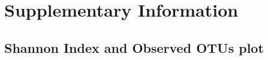 

\renewcommand{\thefigure}{SI.\arabic{figure}}
\setcounter{figure}{0}

\renewcommand{\thetable}{SI.\arabic{table}}
\setcounter{table}{0}

\section*{Supplementary Information}\label{sec:SI}

\renewcommand{\thesubsection}{SI.\arabic{subsection}}
\setcounter{subsection}{0}


\subsection{Shannon Index and Observed OTUs plot}



